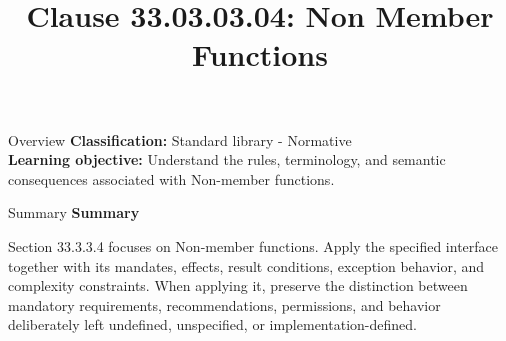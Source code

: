 \documentclass[10pt,letterpaper]{article}
\title{Clause 33.03.03.04: Non Member Functions}
\author{}
\date{}
\begin{document}
\maketitle
\begin{CornellOverviewBox}{Overview}
\textbf{Classification:} Standard library - Normative\\[2pt]
\textbf{Learning objective:} Understand the rules, terminology, and semantic consequences associated with Non-member functions.
\end{CornellOverviewBox}\begin{CornellSummaryBox}{Summary}
{\sffamily\bfseries\color{Accent} Summary}\par\vspace{3pt}Section 33.3.3.4 focuses on Non-member functions. Apply the specified interface together with its mandates, effects, result conditions, exception behavior, and complexity constraints. When applying it, preserve the distinction between mandatory requirements, recommendations, permissions, and behavior deliberately left undefined, unspecified, or implementation-defined.
\end{CornellSummaryBox}
\end{document}

